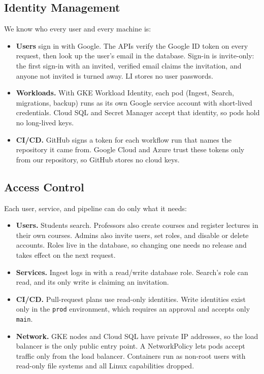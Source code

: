 \documentclass[conference]{IEEEtran}
\begin{document}
\subsection{Identity Management}
We know who every user and every machine is:
\begin{itemize}
\item \textbf{Users} sign in with Google. The APIs verify the Google ID
token on every request, then look up the user's email in the database.
Sign-in is invite-only: the first sign-in with an invited, verified email
claims the invitation, and anyone not invited is turned away. LI stores no
user passwords.
\item \textbf{Workloads.} With GKE Workload Identity, each pod (Ingest,
Search, migrations, backup) runs as its own Google service account with
short-lived credentials. Cloud SQL and Secret Manager accept that identity,
so pods hold no long-lived keys.
\item \textbf{CI/CD.} GitHub signs a token for each workflow run that names
the repository it came from. Google Cloud and Azure trust these tokens only
from our repository, so GitHub stores no cloud keys.
\end{itemize}

\subsection{Access Control}
Each user, service, and pipeline can do only what it needs:
\begin{itemize}
\item \textbf{Users.} Students search. Professors also create courses and
register lectures in their own courses. Admins also invite users, set
roles, and disable or delete accounts. Roles live in the database, so
changing one needs no release and takes effect on the next request.
\item \textbf{Services.} Ingest logs in with a read/write database role.
Search's role can read, and its only write is claiming an invitation.
\item \textbf{CI/CD.} Pull-request plans use read-only identities. Write
identities exist only in the \texttt{prod} environment, which requires an
approval and accepts only \texttt{main}.
\item \textbf{Network.} GKE nodes and Cloud SQL have private IP addresses,
so the load balancer is the only public entry point. A NetworkPolicy lets
pods accept traffic only from the load balancer. Containers run as
non-root users with read-only file systems and all Linux capabilities
dropped.
\end{itemize}
\end{document}
